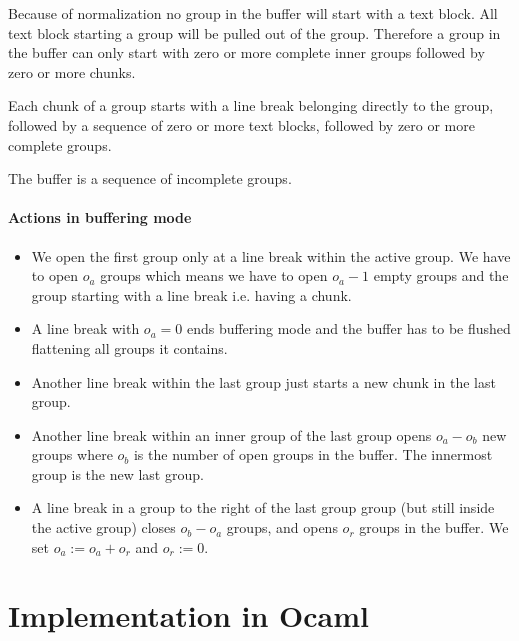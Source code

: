 \documentclass[12pt]{article}
\begin{document}
Because of normalization no group in the buffer will start with a text
block. All text block starting a group will be pulled out of the
group. Therefore a group in the buffer can only start with zero or more
complete inner groups followed by zero or more chunks.

Each chunk of a group starts with a line break belonging directly to the
group, followed by a sequence of zero or more text blocks, followed by zero or
more complete groups.

The buffer is a sequence of incomplete groups.



\paragraph{Actions in buffering mode}
\begin{itemize}
\item We open the first group only at a line break within the active group. We
  have to open $o_a$ groups which means we have to open $o_a - 1$ empty groups
  and the group starting with a line break i.e. having a chunk.

\item A line break with $o_a = 0$ ends buffering mode and the buffer has to be
  flushed flattening all groups it contains.

\item Another line break within the last group just starts a new chunk in the
   last group.

 \item Another line break within an inner group of the last group opens
   $o_a - o_b$ new groups where $o_b$ is the number of open groups in the
   buffer. The innermost group is the new last group.


\item A line break in a group to the right of the last group group (but still
  inside the active group) closes $o_b - o_a$ groups, and opens $o_r$ groups
  in the buffer. We set $o_a := o_a + o_r$ and $o_r := 0$.
\end{itemize}



\section{Implementation in Ocaml}
\end{document}
